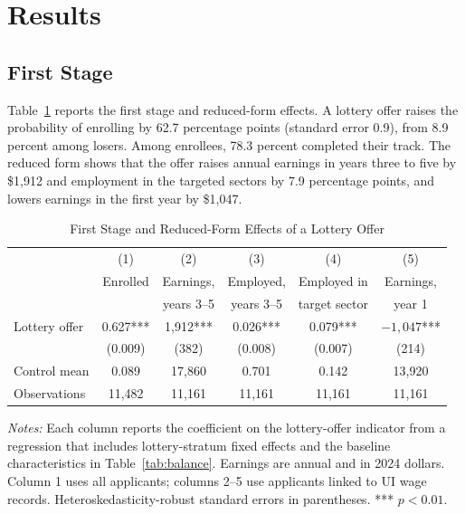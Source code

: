\documentclass[12pt]{article}
\begin{document}
\section{Results}\label{sec:results}

\subsection{First Stage}

Table~\ref{tab:firststage} reports the first stage and reduced-form effects. A lottery offer raises the probability of enrolling by 62.7 percentage points (standard error 0.9), from 8.9 percent among losers. Among enrollees, 78.3 percent completed their track. The reduced form shows that the offer raises annual earnings in years three to five by \$1,912 and employment in the targeted sectors by 7.9 percentage points, and lowers earnings in the first year by \$1,047.

\begin{table}[htbp]
\centering
\small
\caption{First Stage and Reduced-Form Effects of a Lottery Offer}
\label{tab:firststage}
\begin{tabular}{lccccc}
\toprule
 & (1) & (2) & (3) & (4) & (5) \\
 & Enrolled & Earnings, & Employed, & Employed in & Earnings, \\
 & & years 3--5 & years 3--5 & target sector & year 1 \\
\midrule
Lottery offer & 0.627*** & 1,912*** & 0.026*** & 0.079*** & $-1,047$*** \\
 & (0.009) & (382) & (0.008) & (0.007) & (214) \\
\midrule
Control mean & 0.089 & 17,860 & 0.701 & 0.142 & 13,920 \\
Observations & 11,482 & 11,161 & 11,161 & 11,161 & 11,161 \\
\bottomrule
\end{tabular}
\par\medskip
\begin{minipage}{0.92\linewidth}
\footnotesize \textit{Notes:} Each column reports the coefficient on the lottery-offer indicator from a regression that includes lottery-stratum fixed effects and the baseline characteristics in Table~\ref{tab:balance}. Earnings are annual and in 2024 dollars. Column 1 uses all applicants; columns 2--5 use applicants linked to UI wage records. Heteroskedasticity-robust standard errors in parentheses. *** $p<0.01$.
\end{minipage}
\end{table}
\end{document}
